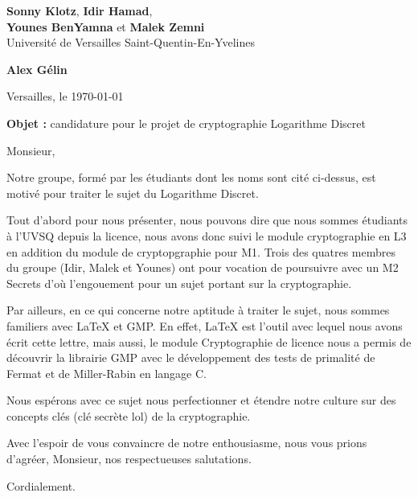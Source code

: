 \documentclass[10pt]{letter}
\begin{document}
\sffamily
	
	\begin{flushleft}
		\singlespacing
		\textbf{Sonny Klotz}, \textbf{Idir Hamad},\\ \textbf{Younes BenYamna} et \textbf{Malek Zemni}\\[.35ex]
		\footnotesize
		Université de Versailles Saint-Quentin-En-Yvelines 
	\end{flushleft}
	
	\begin{flushright}
		\singlespacing
		\textbf{Alex Gélin}\\[.35ex]
	\end{flushright}
 
	\begin{flushright}Versailles, le \today\\\end{flushright}

	\vspace{1em}
	
	\textbf{Objet :} candidature pour le projet de cryptographie \guillemotleft Logarithme Discret\guillemotright
	
	Monsieur,
	
	\hspace{1cm} Notre groupe, formé par les étudiants dont les noms sont cité ci-dessus, est motivé pour traiter le sujet du Logarithme Discret.
	
	\hspace{1cm} Tout d'abord pour nous présenter, nous pouvons dire que nous sommes étudiants à l'UVSQ depuis la licence, nous avons donc suivi le module cryptographie en L3 en addition du module de cryptopgraphie pour M1. Trois des quatres membres du groupe (Idir, Malek et Younes) ont pour vocation de poursuivre avec un M2 Secrets d'où l'engouement pour un sujet portant sur la cryptographie.
	
	\hspace{1cm} Par ailleurs, en ce qui concerne notre aptitude à traiter le sujet, nous sommes familiers avec LaTeX et GMP. En effet, LaTeX est l'outil avec lequel nous avons écrit cette lettre, mais aussi, le module Cryptographie de licence nous a permis de découvrir la librairie GMP avec le développement des tests de primalité de Fermat et de Miller-Rabin en langage C.
	
	\hspace{1cm} Nous espérons avec ce sujet nous perfectionner et étendre notre culture sur des concepts clés (clé secrète lol) de la cryptographie.
	
	\hspace{1cm} Avec l’espoir de vous convaincre de notre enthousiasme, nous vous prions d’agréer, Monsieur, nos respectueuses salutations.
	
	\begin{flushright}
		Cordialement.
	\end{flushright}
\end{document}
